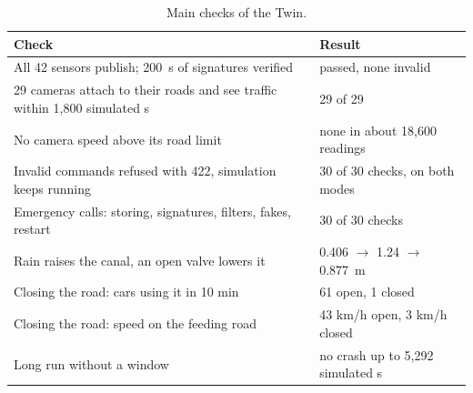 \begin{table}[t]
\centering
\caption{Main checks of the Twin.}
\label{tab:checked}
\footnotesize
\renewcommand{\arraystretch}{1.05}
\begin{tabular}{@{}p{4.6cm} p{3.3cm}@{}}
\toprule
\textbf{Check} & \textbf{Result}\\
\midrule
All 42 sensors publish; 200~s of signatures verified & passed, none invalid\\
29 cameras attach to their roads and see traffic within 1,800 simulated s & 29 of 29\\
No camera speed above its road limit & none in about 18,600 readings\\
Invalid commands refused with 422, simulation keeps running & 30 of 30 checks, on both modes\\
Emergency calls: storing, signatures, filters, fakes, restart & 30 of 30 checks\\
Rain raises the canal, an open valve lowers it & 0.406 $\to$ 1.24 $\to$ 0.877~m\\
Closing the road: cars using it in 10 min & 61 open, 1 closed\\
Closing the road: speed on the feeding road & 43 km/h open, 3 km/h closed\\
Long run without a window & no crash up to 5,292 simulated s\\
\bottomrule
\end{tabular}
\end{table}

